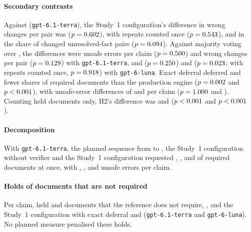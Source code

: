\paragraph{Secondary contrasts}
Against  (\texttt{gpt-6.1-terra}), the Study~1 configuration's difference in wrong changes per pair was \ctTerraHThreeDDiff{} ($p=0.602$), \ctTerraHThreeDedupDDiff{} with repeats counted once ($p=0.543$), and in the share of changed unresolved-fact pairs \ctTerraHFourDDiff{} ($p=0.094$). Against majority voting over , the differences were \ctTerraHOneSCDiff{} unsafe errors per claim ($p=0.500$) and \ctTerraHThreeRSCDiff{} wrong changes per pair ($p=0.129$) with \texttt{gpt-6.1-terra}, and \ctLunaHOneSCDiff{} ($p=0.250$) and \ctLunaHThreeRSCDiff{} ($p=0.023$; \ctLunaHThreeDedupRSCDiff{} with repeats counted once, $p=0.918$) with \texttt{gpt-6-luna}. Exact deferral deferred \ctTerraHTwoBDeferDiff{} and \ctLunaHTwoBDeferDiff{} fewer shares of required documents than the production engine ($p=0.002$ and $p<0.001$), with unsafe-error differences of \ctTerraHTwoBUnsafeDiff{} and \ctLunaHTwoBUnsafeDiff{} per claim ($p=1.000$ and \ctLunaHTwoBUnsafeP). Counting held documents only, H2's difference was \ctTerraHTwoHeldDiff{} and \ctLunaHTwoHeldDiff{} ($p<0.001$ and $p<0.001$).

\paragraph{Decomposition}
With \texttt{gpt-6.1-terra}, the planned sequence from  to , the Study~1 configuration without verifier and the Study~1 configuration requested \pct{\tenTerraBoneRecall}, \pct{\tenTerraBtwoRecall}, \pct{\tenTerraCPxnRecall} and \pct{\tenTerraCPxRecall} of required documents at once, with \tenTerraBoneUnsafe, \tenTerraBtwoUnsafe, \tenTerraCPxnUnsafe{} and \tenTerraCPxUnsafe{} unsafe errors per claim.

\paragraph{Holds of documents that are not required}
Per claim,  held \tenTerraBoneHoldsNonreq{} and \tenLunaBoneHoldsNonreq{} documents that the reference does not require,  \tenTerraBtwoHoldsNonreq, and the Study~1 configuration with exact deferral \tenTerraCPxHoldsNonreq{} and \tenLunaCPxHoldsNonreq{} (\texttt{gpt-6.1-terra} and \texttt{gpt-6-luna}). No planned measure penalised these holds.

